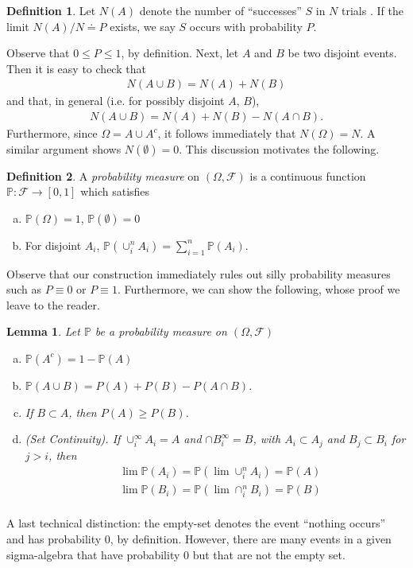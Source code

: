 \documentclass[12pt]{article}
\newcommand{\filter}{\mathcal{F}}
\newcommand{\prob}{\mathbb{P}}
\theoremstyle{plain}
\newtheorem{lemma}[theorem]{Lemma}
\theoremstyle{definition}
\newtheorem*{definition}{Definition}
\theoremstyle{remark}
\numberwithin{equation}{section}  %
\begin{document}
\begin{definition}
Let $N(A)$ denote the number of ``successes'' $S$ in $N$ trials . If the
limit $N(A)/N \doteq P$ exists, we say $S$ occurs with probability $P$.
\end{definition}
Observe that $ 0 \le P \le 1$, by definition.
Next, let $A$ and $B$ be two disjoint events. Then
it is easy to check that
\begin{align*}
N(A \cup B) = N(A) + N(B)
\end{align*}
and that, in general (i.e. for possibly disjoint $A$, $B$),
\begin{align*}
N(A \cup B) = N(A) + N(B) - N(A \cap B).
\end{align*}
Furthermore, since $\Omega = A \cup A^c$, it follows immediately
that $N(\Omega) = N$. A similar argument shows $N(\emptyset) = 0$.
This discussion motivates the following.
\begin{definition}
A \emph{probability measure} on $(\Omega, \filter)$ is a continuous function
$\prob: \filter \to [0,1]$ which satisfies
\begin{enumerate}[a)]
	\item
$\prob(\Omega) = 1$, $\prob(\emptyset) = 0$
\item
For disjoint $A_i$, $\prob(\cup_i^n A_i) = \sum_{i = 1}^n \prob(A_i)$.
\end{enumerate}
\end{definition}
Observe that our construction immediately rules out silly probability
measures such as $P \equiv 0$ or $P \equiv 1$. Furthermore,
we can show the following, whose proof we leave to the reader.
\begin{lemma}
Let $\prob$ be a probability measure on $(\Omega, \filter)$
\begin{enumerate}[a)]
\item $\prob(A^c) = 1 - \prob(A)$
\item $\prob(A \cup B) = P(A) + P(B) - P(A \cap B)$.
\item If $B \subset A$, then $P(A) \ge P(B)$.
\item \emph{(Set Continuity)}.
If $\cup_i^\infty A_i = A$ and
$\cap B_i^\infty = B$, with $A_i \subset A_j$ and $B_j \subset B_i$ for $j > i$,
then
\begin{align*}
& \lim \prob(A_i) = \prob(\lim \cup_i^n A_i) = \prob(A) \\
& \lim \prob(B_i) = \prob(\lim \cap_i^n B_i) = \prob(B) \\
\end{align*}
\end{enumerate}
\end{lemma}
A last technical distinction: the empty-set denotes the event ``nothing
occurs'' and has probability $0$, by definition. However, there are many
events in a given sigma-algebra that have probability $0$ but that are not the
empty set.
\end{document}
